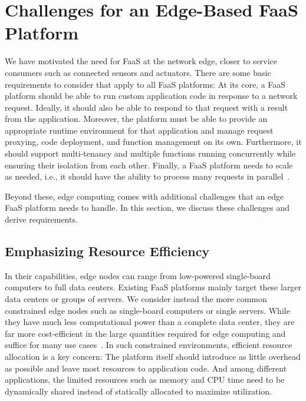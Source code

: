 \section{Challenges for an Edge-Based FaaS Platform}
\label{cha:background}

We have motivated the need for FaaS at the network edge, closer to service consumers such as connected sensors and actuators.
There are some basic requirements to consider that apply to all FaaS platforms:
At its core, a FaaS platform should be able to run custom application code in response to a network request.
Ideally, it should also be able to respond to that request with a result from the application.
Moreover, the platform must be able to provide an appropriate runtime environment for that application and manage request proxying, code deployment, and function management on its own.
Furthermore, it should support multi-tenancy and multiple functions running concurrently while ensuring their isolation from each other.
Finally, a FaaS platform needs to scale as needed, i.e., it should have the ability to process many requests in parallel~\cite{Baldini2017-zf}.

Beyond these, edge computing comes with additional challenges that an edge FaaS platform needs to handle.
In this section, we discuss these challenges and derive requirements.

\subsection{Emphasizing Resource Efficiency}
\label{sec:efficiency}

In their capabilities, edge nodes can range from low-powered single-board computers to full data centers.
Existing FaaS platforms mainly target these larger data centers or groups of servers.
We consider instead the more common constrained edge nodes such as single-board computers or single servers.
While they have much less computational power than a complete data center, they are far more cost-efficient in the large quantities required for edge computing and suffice for many use cases~\cite{paper_bermbach_fog_computing}.
In such constrained environments, efficient resource allocation is a key concern:
The platform itself should introduce as little overhead as possible and leave most resources to application code.
And among different applications, the limited resources such as memory and CPU time need to be dynamically shared instead of statically allocated to maximize utilization.

